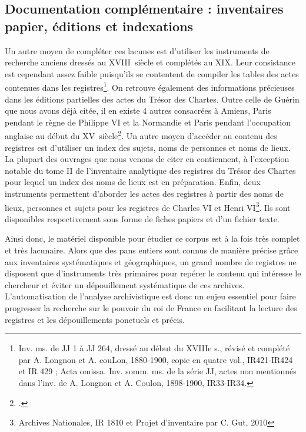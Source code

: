 \documentclass[a4paper,12pt,twoside]{book}
\begin{document}
	\subsection{Documentation complémentaire : inventaires papier, éditions et indexations}
	
	Un autre moyen de compléter ces lacunes est d'utiliser les instruments de recherche anciens dressés au XVIII\ieme\ siècle et complétés au XIX\ieme. Leur consistance est cependant assez faible puisqu'ils se contentent de compiler les tables des actes contenues dans les registres\footnote{Inv. ms. de JJ 1 à JJ 264, dressé au début du XVIIIe s., révisé et complété par A. Longnon et A. couLon, 1880-1900, copie en quatre vol., IR421-IR424 et IR 429 ; Acta omissa. Inv. somm. ms. de la série JJ, actes non mentionnés dans	l’inv. de A. Longnon et A. Coulon, 1898-1900, IR33-IR34.}. On retrouve également des informations précieuses dans les éditions partielles des actes du Trésor des Chartes. Outre celle de Guérin que nous avons déjà citée, il en existe 4 autres consacrées à Amiens, Paris pendant le règne de Philippe VI et la Normandie et Paris pendant l'occupation anglaise au début du XV\ieme\ siècle\footcite{guerin_actes_1881, viard_documents_1899, longnon_paris_1878, le_cacheux_actes_1907, maugis_documents_1908}. Un autre moyen d'accéder au contenu des registres est d'utiliser un index des sujets, noms de personnes et noms de lieux. La plupart des ouvrages que nous venons de citer en contiennent, à l'exception notable du tome II de l'inventaire analytique des registres du Trésor des Chartes pour lequel un index des noms de lieux est en préparation. Enfin, deux instruments permettent d'aborder les actes des registres à partir des noms de lieux, personnes et sujets pour les registres de Charles VI et Henri VI\footnote{Archives Nationales, IR 1810 et Projet d'inventaire par C. Gut, 2010}. Ils sont disponibles respectivement sous forme de fiches papiers et d'un fichier texte. 
	
	Ainsi donc, le matériel disponible pour étudier ce corpus est à la fois très complet et très lacunaire. Alors que des pans entiers sont connus de manière précise grâce aux inventaires systématiques et géographiques, un grand nombre de registres ne disposent que d'instruments très primaires pour repérer le contenu qui intéresse le chercheur et éviter un dépouillement systématique de ces archives. L'automatisation de l'analyse archivistique est donc un enjeu essentiel pour faire progresser la recherche sur le pouvoir du roi de France en facilitant la lecture des registres et les dépouillements ponctuels et précis.
\end{document}
